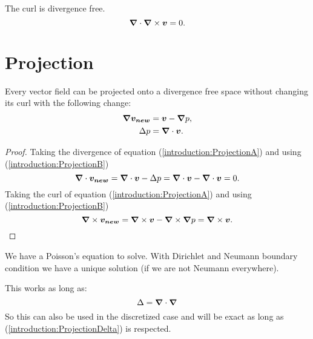 \begin{property}
The curl is divergence free.
 \begin{equation}
  {\boldsymbol {\nabla}}\cdot {\boldsymbol {\nabla}} \times {\boldsymbol {v}}=0.
 \end{equation}
\end{property}

\section{Projection}
\label{introduction:projection}
\begin{property}
 Every vector field can be projected onto a divergence free space without changing its curl with the following change:
\begin{align}
 {\boldsymbol {\nabla}}{\boldsymbol {v_{new}}}&={\boldsymbol {v}}-{\boldsymbol {\nabla}}p \label{introduction:ProjectionA},\\
 \Delta p&={\boldsymbol {\nabla}} \cdot {\boldsymbol {v}} \label{introduction:ProjectionB}.
\end{align}
\end{property}
\begin{proof}
  Taking the divergence of equation (\ref{introduction:ProjectionA}) and using (\ref{introduction:ProjectionB})
  \begin{equation}
   {\boldsymbol {\nabla}}\cdot{\boldsymbol {v_{new}}}={\boldsymbol {\nabla}}\cdot{\boldsymbol {v}}-\Delta p={\boldsymbol {\nabla}}\cdot{\boldsymbol {v}}-{\boldsymbol {\nabla}}\cdot{\boldsymbol {v}}=0.
  \end{equation}
  Taking the curl of equation (\ref{introduction:ProjectionA}) and using (\ref{introduction:ProjectionB})
  \begin{equation}
   {\boldsymbol {\nabla}}\times{\boldsymbol {v_{new}}}={\boldsymbol {\nabla}}\times{\boldsymbol {v}}-{\boldsymbol {\nabla}}\times{\boldsymbol {\nabla}} p={\boldsymbol {\nabla}}\times{\boldsymbol {v}}.
  \end{equation}
  \end{proof}
  
   \begin{remark}
    We have a Poisson's equation to solve. With Dirichlet and Neumann boundary condition we have a unique solution (if we are not
    Neumann everywhere).	
   \end{remark}

  
  \begin{remark}
 This works as long as:
 \begin{equation}
  \Delta={\boldsymbol {\nabla}}\cdot {\boldsymbol {\nabla}}\label{introduction:ProjectionDelta}
 \end{equation}
 So this can also be used in the discretized case and will be exact as long as (\ref{introduction:ProjectionDelta}) is respected.
 \end{remark}



